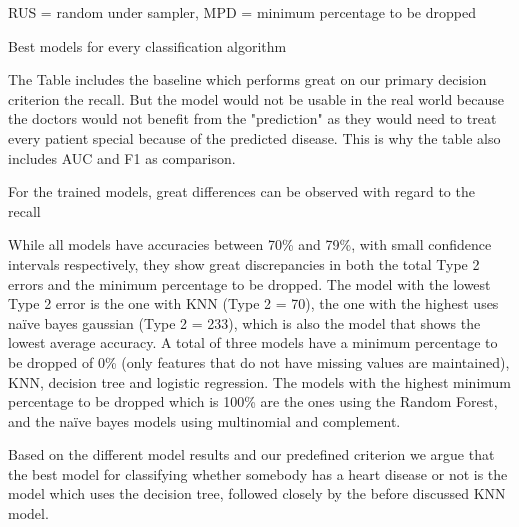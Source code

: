 \begin{table}[]
\begin{footnotesize}
		\begin{center}
			\centering
			RUS = random under sampler, MPD = minimum percentage to be dropped
		\end{center}
	\end{footnotesize}
	\caption{Best models for every classification algorithm}
	\label{table:modelresults}

\end{table}

The Table includes the baseline which performs great on our primary decision criterion the recall. But the model would not be usable in the real world because the doctors would not benefit from the "prediction" as they would need to treat every patient special because of the predicted disease. This is why the table also includes AUC and F1 as comparison. 

For the trained models, great differences can be observed with regard to the recall 

While all models have accuracies between 70\% and 79\%, with small confidence intervals respectively, they show great discrepancies in both the total Type 2 errors and the minimum percentage to be dropped. The model with the lowest Type 2 error is the one with KNN (Type 2 = 70), the one with the highest uses naïve bayes gaussian (Type 2 = 233), which is also the model that shows the lowest average accuracy. A total of three models have a minimum percentage to be dropped of 0\% (only features that do not have missing values are maintained), KNN, decision tree and logistic regression. The models with the highest minimum percentage to be dropped which is 100\% are the ones using the Random Forest, and the naïve bayes models using multinomial and complement.

Based on the different model results and our predefined criterion we argue that the best model for classifying whether somebody has a heart disease or not is the model which uses the decision tree, followed closely by the before discussed KNN model.

